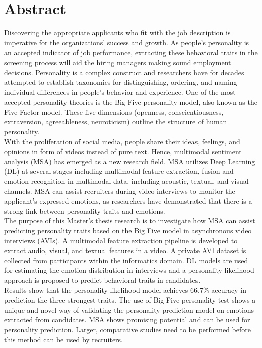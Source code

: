 \chapter*{Abstract}
Discovering the appropriate applicants who fit with the job description is imperative for the organizations' success and growth. As people's personality is an accepted indicator of job performance, extracting these behavioral traits in the screening process will aid the hiring managers making sound employment decisions. Personality is a complex construct and researchers have for decades attempted to establish taxonomies for distinguishing, ordering, and naming individual differences in people's behavior and experience. One of the most accepted personality theories is the Big Five personality model, also known as the Five-Factor model. These five dimensions (openness, conscientiousness, extraversion, agreeableness, neuroticism) outline the structure of human personality. \\

With the proliferation of social media, people share their ideas, feelings, and opinions in form of videos instead of pure text. Hence, multimodal sentiment analysis (MSA) has emerged as a new research field. MSA utilizes Deep Learning (DL) at several stages including multimodal feature extraction, fusion and emotion recognition in multimodal data, including acoustic, textual, and visual channels. MSA can assist recruiters during video interviews to monitor the applicant's expressed emotions, as researchers have demonstrated that there is a strong link between personality traits and emotions. \\

The purpose of this Master's thesis research is to investigate how MSA can assist predicting personality traits based on the Big Five model in asynchronous video interviews (AVIs). A multimodal feature extraction pipeline is developed to extract audio, visual, and textual features in a video. A private AVI dataset is collected from participants within the informatics domain. DL models are used for estimating the emotion distribution in interviews and a personality likelihood approach is proposed to predict behavioral traits in candidates. \\

Results show that the personality likelihood model achieves 66.7\% accuracy in prediction the three strongest traits. The use of Big Five personality test shows a unique and novel way of validating the personality prediction model on emotions extracted from candidates. MSA shows promising potential and can be used for personality prediction. Larger, comparative studies need to be performed before this method can be used by recruiters.  



